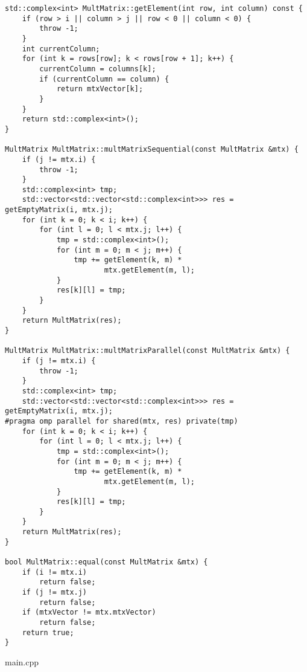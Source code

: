 \documentclass{report}
\begin{document}
\begin{lstlisting}
std::complex<int> MultMatrix::getElement(int row, int column) const {
    if (row > i || column > j || row < 0 || column < 0) {
        throw -1;
    }
    int currentColumn;
    for (int k = rows[row]; k < rows[row + 1]; k++) {
        currentColumn = columns[k];
        if (currentColumn == column) {
            return mtxVector[k];
        }
    }
    return std::complex<int>();
}

MultMatrix MultMatrix::multMatrixSequential(const MultMatrix &mtx) {
    if (j != mtx.i) {
        throw -1;
    }
    std::complex<int> tmp;
    std::vector<std::vector<std::complex<int>>> res = getEmptyMatrix(i, mtx.j);
    for (int k = 0; k < i; k++) {
        for (int l = 0; l < mtx.j; l++) {
            tmp = std::complex<int>();
            for (int m = 0; m < j; m++) {
                tmp += getElement(k, m) *
                       mtx.getElement(m, l);
            }
            res[k][l] = tmp;
        }
    }
    return MultMatrix(res);
}

MultMatrix MultMatrix::multMatrixParallel(const MultMatrix &mtx) {
    if (j != mtx.i) {
        throw -1;
    }
    std::complex<int> tmp;
    std::vector<std::vector<std::complex<int>>> res = getEmptyMatrix(i, mtx.j);
#pragma omp parallel for shared(mtx, res) private(tmp)
    for (int k = 0; k < i; k++) {
        for (int l = 0; l < mtx.j; l++) {
            tmp = std::complex<int>();
            for (int m = 0; m < j; m++) {
                tmp += getElement(k, m) *
                       mtx.getElement(m, l);
            }
            res[k][l] = tmp;
        }
    }
    return MultMatrix(res);
}

bool MultMatrix::equal(const MultMatrix &mtx) {
    if (i != mtx.i)
        return false;
    if (j != mtx.j)
        return false;
    if (mtxVector != mtx.mtxVector)
        return false;
    return true;
}

\end{lstlisting}
main.cpp
\end{document}
